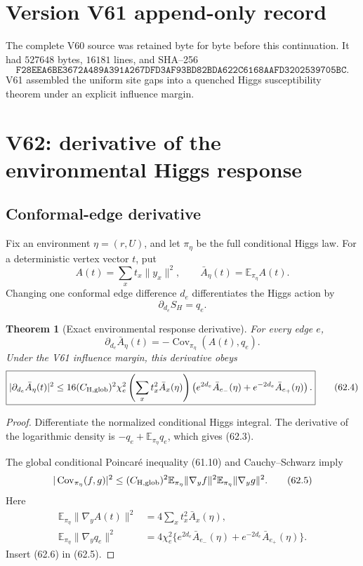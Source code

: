 \documentclass[11pt]{article}
\newtheorem{theorem}{Theorem}[section]
\theoremstyle{remark}
\begin{document}
\section*{Version V61 append-only record}
The complete V60 source was retained byte for byte before this
continuation.  It had \(527648\) bytes, \(16181\) lines, and SHA--256
\[
 \texttt{F28EEA6BE3672A489A391A267DFD3AF93BD82BDA622C6168AAFD3202539705BC}.
\]
V61 assembled the uniform site gaps into a quenched Higgs
susceptibility theorem under an explicit influence margin.


\section{V62: derivative of the environmental Higgs response}
\label{sec:v17v62}

\subsection{Conformal-edge derivative}

Fix an environment \(\eta=(r,U)\), and let \(\pi_\eta\) be the full
conditional Higgs law.  For a deterministic vertex vector \(t\), put
\[
 A(t)=\sum_xt_x\|y_x\|^2,\qquad
 \bar A_\eta(t)=\mathbb E_{\pi_\eta}A(t).          \tag{62.1}
\]
Changing one conformal edge difference \(d_e\) differentiates the
Higgs action by
\[
 \partial_{d_e}S_H=q_e.                           \tag{62.2}
\]

\begin{theorem}[Exact environmental response derivative]
\label{thm:v17v62-derivative}
For every edge \(e\),
\[
\boxed{
 \partial_{d_e}\bar A_\eta(t)
 =
 -\operatorname{Cov}_{\pi_\eta}(A(t),q_e).}       \tag{62.3}
\]
Under the V61 influence margin, this derivative obeys
\[
\boxed{
 |\partial_{d_e}\bar A_\eta(t)|^2
 \leq
 16(C_{\rm H,glob})^2\chi_e^2
 \left(\sum_xt_x^2\bar A_x(\eta)\right)
 \left(
 e^{2d_e}\bar A_{e_-}(\eta)
 +e^{-2d_e}\bar A_{e_+}(\eta)
 \right).}                                       \tag{62.4}
\]
\end{theorem}

\begin{proof}
Differentiate the normalized conditional Higgs integral.  The
derivative of the logarithmic density is
\(-q_e+\mathbb E_{\pi_\eta}q_e\), which gives (62.3).

The global conditional Poincar\'e inequality (61.10) and
Cauchy--Schwarz imply
\[
 |\operatorname{Cov}_{\pi_\eta}(f,g)|^2
 \leq
 (C_{\rm H,glob})^2
 \mathbb E_{\pi_\eta}\|\nabla_yf\|^2
 \mathbb E_{\pi_\eta}\|\nabla_yg\|^2.             \tag{62.5}
\]
Here
\[
\begin{aligned}
 \mathbb E_{\pi_\eta}\|\nabla_yA(t)\|^2
 &=4\sum_xt_x^2\bar A_x(\eta),\\
 \mathbb E_{\pi_\eta}\|\nabla_yq_e\|^2
 &=4\chi_e^2
 \{e^{2d_e}\bar A_{e_-}(\eta)
 +e^{-2d_e}\bar A_{e_+}(\eta)\}.                 \tag{62.6}
\end{aligned}
\]
Insert (62.6) in (62.5).
\end{proof}
\end{document}
